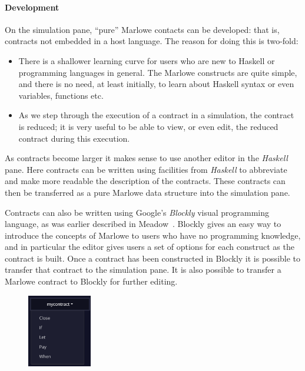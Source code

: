 \documentclass[runningheads]{llncs}
\begin{document}
\paragraph{Development}

On the simulation pane, ``pure'' Marlowe contacts can be developed: that is, contracts not embedded in a host language. The reason for doing this is two-fold:
\begin{itemize}
    \item There is a shallower learning curve for users who are new to Haskell or programming languages in general. The Marlowe constructs are quite simple, and there is no need, at least initially, to learn about Haskell syntax or even variables, functions etc.
    \item As we step through the execution of a contract in a simulation, the contract is reduced; it is very useful to be able to view, or even edit, the reduced contract during this execution.
\end{itemize}
As contracts become larger it makes sense to use another editor in the \emph{Haskell} pane. Here contracts can be written using facilities from \emph{Haskell} to abbreviate and make more readable the description of the contracts. These contracts can then be transferred as a pure Marlowe data structure into the simulation pane.

Contracts can also be written using Google's \emph{Blockly} visual programming language, as was earlier described in Meadow~\cite{isola-marlowe}. Blockly gives an easy way to introduce the concepts of Marlowe to users who have no programming knowledge, and in particular the editor gives users a set of options for each construct as the contract is built. Once a contract has been constructed in Blockly it is possible to transfer that contract to the simulation pane.%
It is also possible to transfer a Marlowe contract to Blockly for further editing.

\begin{figure}
    \vspace*{-0.3in}
    \includegraphics[width=0.25\textwidth]{hole_options.png}
\end{figure}
\end{document}
